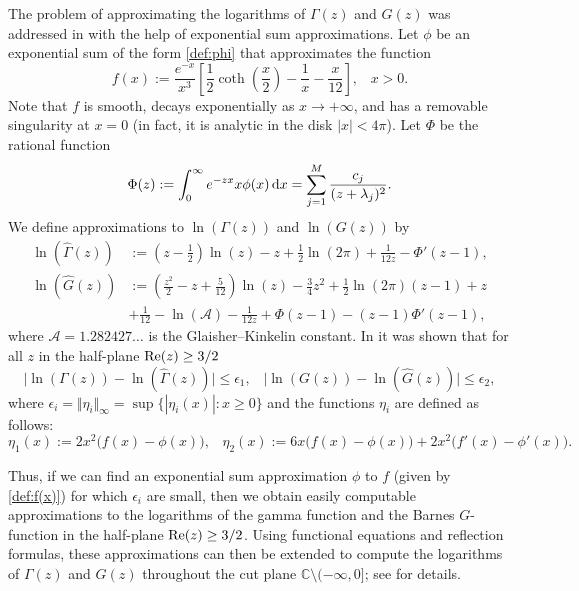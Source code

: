 \documentclass[12pt]{article}
\def\re{\textnormal {Re}}
\def\c{{\mathbb C}}
\def\d{{\textnormal d}}
\begin{document}
The problem of approximating the logarithms of $\Gamma(z)$ and $G(z)$ was addressed in \cite{Kuznetsov_2022} with the help of exponential sum approximations.  Let $\phi$ be an exponential sum of the form \eqref{def:phi} that approximates the function
\begin{equation}\label{def:f(x)}
f(x):=\frac{e^{-x}}{x^3} \left[\frac{1}{2} \coth\left(\frac{x}{2}\right)- \frac{1}{x}-\frac{x}{12} \right], \;\;\; x>0. 
\end{equation}
Note that $f$ is smooth, decays exponentially as $x\to +\infty$, and has a removable singularity at $x=0$ (in fact, it is analytic in the disk $|x|<4\pi$). Let $\Phi$ be the rational function
\begin{equation*}
 \Phi(z):=\int_0^{\infty} e^{-z x} x \phi(x) \, \d x=
  \sum_{j=1}^M \frac{c_j}{(z+\lambda_j)^{2}}. 
\end{equation*}
We define approximations to $\ln(\Gamma(z))$ and $\ln(G(z))$ by
\begin{align}
\label{eq:ln_Gamma_approx}
\ln(\widehat \Gamma(z))&:=\left(z-\frac12 \right)\ln(z) - z+\frac12 \ln(2\pi)  + \frac{1}{12z}-\Phi'(z-1), \\
\label{eq:ln_G_approx}
\ln(\widehat G(z))&:=\left(\frac{z^2}{2}-z+\frac{5}{12}\right)\ln(z)
-\frac{3}{4}z^2
+\frac{1}{2}\ln(2\pi)(z-1)+z \nonumber\\
&+\frac{1}{12}-\ln({\mathcal A})-\frac{1}{12z}+\Phi(z-1)-(z-1)\Phi'(z-1),
\end{align}
where ${\mathcal A}=1.282427\dots$ is the Glaisher--Kinkelin constant.  
In \cite[Proposition 2]{Kuznetsov_2022} it was shown that for all $z$ in the half-plane $\re(z) \ge 3/2$ 
\begin{equation}\label{gamma_G_approximations}
 \big|\ln(\Gamma(z))-\ln(\widehat \Gamma(z))\big| \le  \epsilon_1, \;\;\; 
 \big|\ln(G(z))-\ln(\widehat G(z))\big| \le  \epsilon_2, 
\end{equation}
where $\epsilon_i=\Vert \eta_i \Vert_{\infty}=\sup\{ |\eta_i(x)| : x\ge 0\}$
and the functions $\eta_i$ are defined as follows: 
\[
 \eta_1(x):=2x^2 \big(f(x)-\phi(x)\big), \;\;\; 
 \eta_2(x):=6x\big(f(x)-\phi(x)\big)+2x^2\big(f'(x)- \phi'(x)\big).
\]



 
Thus, if we can find an exponential sum approximation $\phi$ to $f$ (given by \eqref{def:f(x)}) for which $\epsilon_i$ are small, then we obtain easily computable approximations to the logarithms of the gamma function and the Barnes $G$-function in the half-plane $\re(z)\ge 3/2$. Using functional equations and reflection formulas, these approximations can then be extended to compute the logarithms of $\Gamma(z)$ and $G(z)$ throughout the cut plane $\c \setminus (-\infty,0]$; see \cite{Kuznetsov_2022} for details.  
\end{document}
